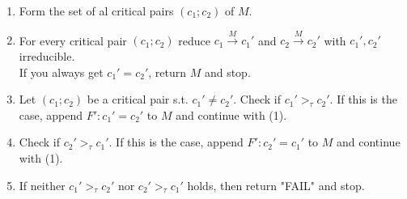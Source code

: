\documentclass[a4paper]{article}
\begin{document}
\begin{enumerate}[(1)]
	\item Form the set of al critical pairs $(c_1;c_2)$ of $M$.
	\item For every critical pair $(c_1;c_2)$ reduce $c_1\overset{M}{\rightarrow} c_1'$ and $c_2\overset{M}{\rightarrow} c_2'$ with $c_1',c_2'$ irreducible.\\
	If you always get $c_1'=c_2'$, return $M$ and stop.
	\item Let $(c_1;c_2)$ be a critical pair s.t. $c_1'\neq c_2'$. Check if $c_1'>_\tau c_2'$. If this is the case, append $F':c_1'=c_2'$ to $M$ and continue with (1).
	\item Check if $c_2'>_\tau c_1'$. If this is the case, append $F':c_2'=c_1'$ to $M$ and continue with (1).
	\item If neither $c_1'>_\tau c_2'$ nor $c_2'>_\tau c_1'$ holds, then return "FAIL" and stop.
\end{enumerate}
\end{document}
